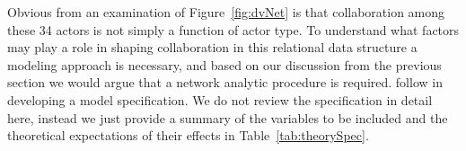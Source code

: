 Obvious from an examination of Figure~\ref{fig:dvNet} is that collaboration among these 34 actors is not simply a function of actor type. To understand what factors may play a role in shaping collaboration in this relational data structure a modeling approach is necessary, and based on our discussion from the previous section we would argue that a network analytic procedure is required. \citet{cranmer:etal:2016} follow \citet{ingold:fischer:2014} in developing a model specification. We do not review the specification in detail here, instead we just provide a summary of the variables to be included and the theoretical expectations of their effects in Table~\ref{tab:theorySpec}. 


